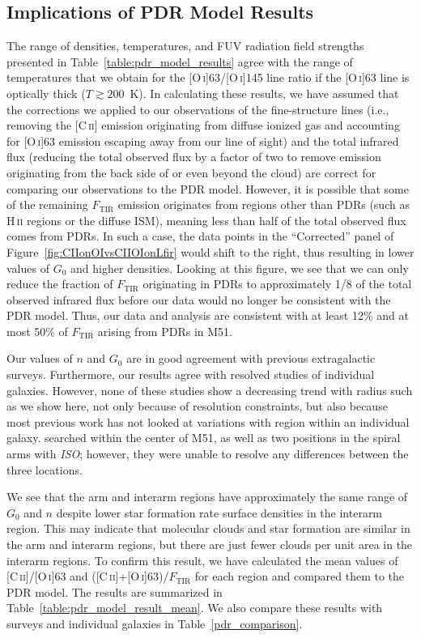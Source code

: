 \subsection{Implications of PDR Model Results}
The range of densities, temperatures, and FUV radiation field strengths presented in Table~\ref{table:pdr_model_results} agree with the range of temperatures that we obtain for the [O\,\textsc{i}]63/[O\,\textsc{i}]145 line ratio if the [O\,\textsc{i}]63 line is optically thick ($T \gtrsim 200$~K).  In calculating these results, we have assumed that the corrections we applied to our observations of the fine-structure lines (i.e., removing the [C\,\textsc{ii}] emission originating from diffuse ionized gas and accounting for [O\,\textsc{i}]63 emission escaping away from our line of sight) and the total infrared flux (reducing the total observed flux by a factor of two to remove emission originating from the back side of or even beyond the cloud) are correct for comparing our observations to the PDR model.  However, it is possible that some of the remaining $F_{\mathrm{TIR}}$ emission originates from regions other than PDRs (such as H\,\textsc{ii} regions or the diffuse ISM), meaning less than half of the total observed flux comes from PDRs.  In such a case, the data points in the ``Corrected'' panel of Figure~\ref{fig:CIIonOIvsCIIOIonLfir} would shift to the right, thus resulting in lower values of $G_{0}$ and higher densities.  Looking at this figure, we see that we can only reduce the fraction of $F_{\mathrm{TIR}}$ originating in PDRs to approximately 1/8 of the total observed infrared flux before our data would no longer be consistent with the PDR model.  Thus, our data and analysis are consistent with at least 12\% and at most 50\% of $F_{\mathrm{TIR}}$ arising from PDRs in M51.

Our values of $n$ and $G_{0}$ are in good agreement with previous extragalactic surveys. Furthermore, our results agree with resolved studies of individual galaxies.  However, none of these studies show a decreasing trend with radius such as we show here, not only because of resolution constraints, but also because most previous work has not looked at variations with region within an individual galaxy.  \citet{2005A&A...441..961K} searched within the center of M51, as well as two positions in the spiral arms with \emph{ISO}; however, they were unable to resolve any differences between the three locations.

We see that the arm and interarm regions have approximately the same range of $G_{0}$ and $n$ despite lower star formation rate surface densities in the interarm region.  This may indicate that molecular clouds and star formation are similar in the arm and interarm regions, but there are just fewer clouds per unit area in the interarm regions.  To confirm this result, we have calculated the mean values of [C\,\textsc{ii}]/[O\,\textsc{i}]63 and ([C\,\textsc{ii}]+[O\,\textsc{i}]63)/$F_{\mathrm{TIR}}$ for each region and compared them to the PDR model.  The results are summarized in Table~\ref{table:pdr_model_result_mean}.  We also compare these results with surveys and individual galaxies in Table~\ref{pdr_comparison}.

